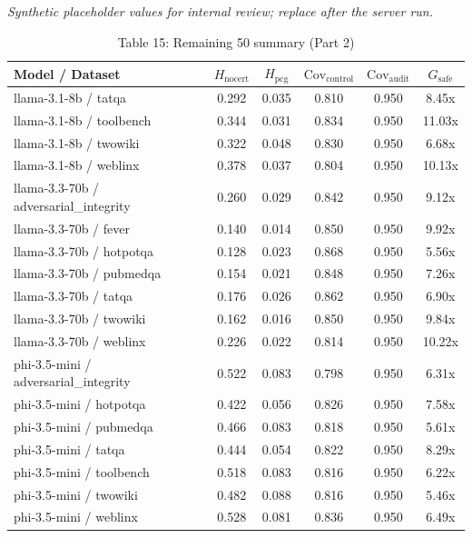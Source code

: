 

\begin{table}[h]
\centering
\small
  \textit{Synthetic placeholder values for internal review; replace after the server run.}
\caption{Table 15: Remaining 50 summary (Part 2)}
\label{tab:appendix_remaining_50_summary_2}
\begin{tabular}{l|cc|cc|c}
\hline
Model / Dataset & $H_{\mathrm{nocert}}$ & $H_{\mathrm{pcg}}$ & $\mathrm{Cov}_{\mathrm{control}}$ & $\mathrm{Cov}_{\mathrm{audit}}$ & $G_{\mathrm{safe}}$ \\
\hline
llama-3.1-8b / tatqa & 0.292 & 0.035 & 0.810 & 0.950 & 8.45x \\
llama-3.1-8b / toolbench & 0.344 & 0.031 & 0.834 & 0.950 & 11.03x \\
llama-3.1-8b / twowiki & 0.322 & 0.048 & 0.830 & 0.950 & 6.68x \\
llama-3.1-8b / weblinx & 0.378 & 0.037 & 0.804 & 0.950 & 10.13x \\
llama-3.3-70b / adversarial_integrity & 0.260 & 0.029 & 0.842 & 0.950 & 9.12x \\
llama-3.3-70b / fever & 0.140 & 0.014 & 0.850 & 0.950 & 9.92x \\
llama-3.3-70b / hotpotqa & 0.128 & 0.023 & 0.868 & 0.950 & 5.56x \\
llama-3.3-70b / pubmedqa & 0.154 & 0.021 & 0.848 & 0.950 & 7.26x \\
llama-3.3-70b / tatqa & 0.176 & 0.026 & 0.862 & 0.950 & 6.90x \\
llama-3.3-70b / twowiki & 0.162 & 0.016 & 0.850 & 0.950 & 9.84x \\
llama-3.3-70b / weblinx & 0.226 & 0.022 & 0.814 & 0.950 & 10.22x \\
phi-3.5-mini / adversarial_integrity & 0.522 & 0.083 & 0.798 & 0.950 & 6.31x \\
phi-3.5-mini / hotpotqa & 0.422 & 0.056 & 0.826 & 0.950 & 7.58x \\
phi-3.5-mini / pubmedqa & 0.466 & 0.083 & 0.818 & 0.950 & 5.61x \\
phi-3.5-mini / tatqa & 0.444 & 0.054 & 0.822 & 0.950 & 8.29x \\
phi-3.5-mini / toolbench & 0.518 & 0.083 & 0.816 & 0.950 & 6.22x \\
phi-3.5-mini / twowiki & 0.482 & 0.088 & 0.816 & 0.950 & 5.46x \\
phi-3.5-mini / weblinx & 0.528 & 0.081 & 0.836 & 0.950 & 6.49x \\

\end{tabular}
\end{table}
